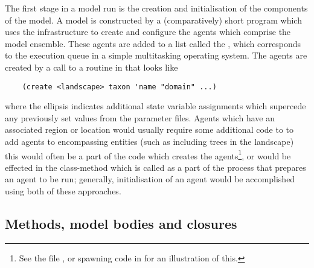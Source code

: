 The first stage in a model run is the creation and initialisation of the
components of the model. A model is constructed by a (comparatively)
short \Scheme program which uses the infrastructure to create
and configure the agents which comprise the model ensemble.  These
agents are added to a list called the , which
corresponds to the execution queue in a simple multitasking operating
system. The agents are created by a call to a routine in
 that looks like
\begin{verbatim}
    (create <landscape> taxon 'name "domain" ...)
\end{verbatim}
where the ellipsis indicates additional state variable
assignments which supercede any previously set values from the
parameter files. Agents which have an associated region or location
would usually require some additional code to to add agents to
encompassing entities (such as including trees in the landscape) this
would often be a part of the code which creates the
agents\footnote{See the file , or spawning
  code in  for an illustration of this.},
or would be effected in the class-method 
which is called as a part of the process that prepares an agent to be
run; generally, initialisation of an agent would be accomplished using
both of these approaches.


\subsection{Methods, model bodies and closures}


